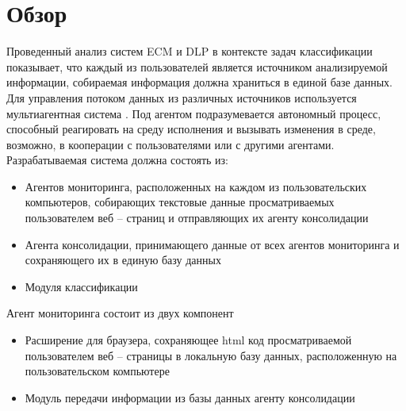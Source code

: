 \documentclass[russian, utf8, emptystyle]{eskdtext}
\begin{document}
\section{Обзор}
Проведенный анализ систем ECM и DLP  в контексте задач классификации показывает, что каждый из пользователей является источником анализируемой информации, собираемая информация должна храниться в единой базе данных. Для управления потоком данных из различных источников используется мультиагентная система \cite{tan}. Под агентом подразумевается  автономный процесс, способный реагировать на среду исполнения и вызывать изменения в среде, возможно, в кооперации с пользователями или с другими агентами.\\
Разрабатываемая система должна состоять из:
\begin{itemize}
	\item Агентов мониторинга, расположенных на каждом из пользовательских компьютеров, собирающих текстовые данные просматриваемых пользователем веб – страниц и отправляющих их агенту консолидации
	\item Агента консолидации, принимающего данные от всех агентов мониторинга и сохраняющего их в единую базу данных
	\item Модуля классификации
\end{itemize}
Агент мониторинга состоит из двух компонент
\begin{itemize}
	\item Расширение для браузера, сохраняющее html код просматриваемой пользователем веб – страницы в локальную базу данных, расположенную на пользовательском компьютере
	\item Модуль передачи информации из базы данных агенту консолидации
\end{itemize}
\end{document}
